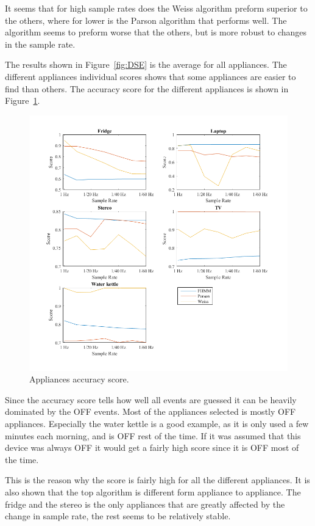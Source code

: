 It seems that for high sample rates does the Weiss algorithm preform superior to the others, where for lower is the Parson algorithm that performs well. The  algorithm seems to preform worse that the others, but is more robust to changes in the sample rate. 

The results shown in Figure~\ref{fig:DSE} is the average for all appliances. The different appliances individual scores shows that some appliances are easier to find than others. The accuracy score for the different appliances is shown in Figure~\ref{fig:AccGS}. 

\begin{figure}[H]
\centering
\includegraphics[width=1\textwidth]{billeder/App-AccuracyScore.png}
\caption{Appliances accuracy score.}
\label{fig:AccGS}
\end{figure}

Since the accuracy score tells how well all events are guessed it can be heavily dominated by the OFF events. Most of the appliances selected is mostly OFF appliances. Especially the water kettle is a good example, as it is only used a few minutes each morning, and is OFF rest of the time. If it was assumed that this device was always OFF it would get a fairly high score since it is OFF most of the time.  

This is the reason why the score is fairly high for all the different appliances. It is also shown that the top algorithm is different form appliance to appliance. The fridge and the stereo is the only appliances that are greatly affected by the change in sample rate, the rest seems to be relatively stable.

